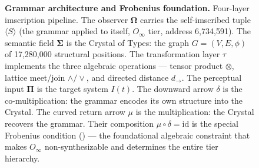 \documentclass[12pt,a4paper]{article}
\begin{document}
\begin{figure}[H]
\centering
{}
\caption{\textbf{Grammar architecture and Frobenius foundation.}
Four-layer imscription pipeline. The observer $\boldsymbol{\Omega}$ carries
the self-imscribed tuple $\langle S \rangle$ (the grammar applied to
itself, $O_\infty$ tier, address 6,734,591). The semantic field
$\boldsymbol{\Sigma}$ is the Crystal of Types: the graph $G=(V,E,\phi)$
of 17,280,000 structural positions. The transformation layer $\tau$
implements the three algebraic operations --- tensor product $\otimes$,
lattice meet/join $\wedge/\vee$, and directed distance $d_\to$. The
perceptual input $\boldsymbol{\Pi}$ is the target system $I(t)$. The
downward arrow $\delta$ is the co-multiplication: the grammar encodes
its own structure into the Crystal. The curved return arrow $\mu$ is
the multiplication: the Crystal recovers the grammar. Their composition
$\mu \circ \delta = \mathrm{id}$ is the special Frobenius condition
() --- the foundational algebraic constraint that
makes $O_\infty$ non-synthesizable and determines the entire tier
hierarchy.}
\label{fig:architecture}
\end{figure}

\end{document}
